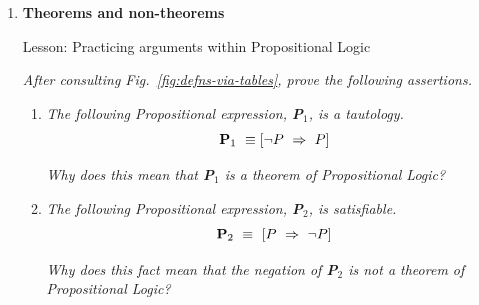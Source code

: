 {\begin{enumerate}
\begin{enumerate}
{\em Hint:}
\begin{itemize}
\item
As you create a new string of numbers, in how many ways can you choose {\em the first number}? {\em the second number}? \ldots
\medskip\item
Based on your answers for the first and second and third numbers of the new string, in how many ways can you choose {\em the first two numbers---i.e., the first {\em pair} of numbers}? {\em the next two numbers}? \ldots
\end{itemize}
  \medskip\item
{\em Strengthen your argument by listing all permutations of  $S' =  \{1,2,3,4,5\}$.}

\smallskip

Write small---there are a lot of permutations.
  \medskip\item
$\oplus \oplus$ {\em Extrapolate from your argument to determine the number of permutations of the set $S" =  \{1,2,3, \ldots, n\}$, as a function of $n$.}
  \end{enumerate}  

\medskip\item
{\bf Theorems and non-theorems}

{\sc Lesson:} Practicing arguments within Propositional Logic

\smallskip

{\em
After consulting Fig.~\ref{fig:defns-via-tables}, prove the following assertions.}

\smallskip

\begin{enumerate}
\item
{\em The following Propositional expression, {\bf P}$_1$, is a tautology.}
\[ {\bf P}_1 \ \equiv \left[ \neg P \ \Rightarrow \ P \right] \]



\smallskip

{\em Why does this mean that {\bf P}$_1$ is a {\em theorem} of Propositional Logic?}

\medskip\item
{\em The following Propositional expression, {\bf P}$_2$, is satisfiable.}
\[ {\bf P}_2 \ \equiv \ \left[ P \ \Rightarrow \ \neg P \right] \]

\smallskip

{\em Why does this fact mean that the {\em negation} of {\bf P}$_2$ is {\em not a theorem} of Propositional Logic?}
\end{enumerate}


\end{enumerate}}
